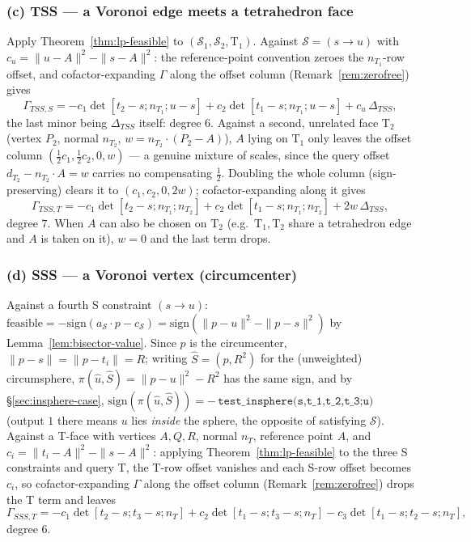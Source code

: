 \documentclass[12pt]{article}
\makeatletter
\theoremstyle{definition}
\theoremstyle{remark}
\renewenvironment{proof}[1][\proofname]{\par
  \pushQED{\qed}%
  \normalfont \footnotesize \topsep6\p@\@plus6\p@\relax
  \list{}{\leftmargin=2em
          \settowidth{\itemindent}{\itshape#1}%
          \labelwidth=\itemindent
          \parsep=0pt \listparindent=\parindent 
  }
  \item[\hskip\labelsep
        \itshape
    #1\@addpunct{.}]\ignorespaces
}{%
  \popQED\endlist\@endpefalse
}
\makeatother
\begin{document}
\begin{proof}
\subsubsection*{(c) TSS --- a Voronoi edge meets a tetrahedron face}
Apply Theorem~\ref{thm:lp-feasible} to $(\mathcal S_1,\mathcal S_2,\mathrm
T_1)$. Against $\mathcal S=(s\!\to\!u)$ with $c_u=\|u-A\|^2-\|s-A\|^2$: the
reference-point convention zeroes the $n_{T_1}$-row offset, and
cofactor-expanding $\Gamma$ along the offset column (Remark~\ref{rem:zerofree})
gives
\begin{equation*}
    \Gamma_{TSS,S} = -c_1\det[t_2{-}s;n_{T_1};u{-}s] + c_2\det[t_1{-}s;n_{T_1};u{-}s] + c_u\,\Delta_{TSS},
\end{equation*}
the last minor being $\Delta_{TSS}$ itself: degree $6$. Against a second,
unrelated face $\mathrm T_2$ (vertex $P_2$, normal $n_{T_2}$,
$w=n_{T_2}\cdot(P_2-A)$), $A$ lying on $\mathrm T_1$ only leaves the offset
column $(\tfrac12c_1,\tfrac12c_2,0,w)$ --- a genuine mixture of scales,
since the query offset $d_{T_2}-n_{T_2}\cdot A=w$ carries no compensating
$\tfrac12$. Doubling the whole column (sign-preserving) clears it to
$(c_1,c_2,0,2w)$; cofactor-expanding along it gives
\begin{equation*}
    \Gamma_{TSS,T} = -c_1\det[t_2{-}s;n_{T_1};n_{T_2}] + c_2\det[t_1{-}s;n_{T_1};n_{T_2}] + 2w\,\Delta_{TSS},
\end{equation*}
degree $7$. When $A$ can also be chosen on $\mathrm T_2$ (e.g.\ $\mathrm
T_1,\mathrm T_2$ share a tetrahedron edge and $A$ is taken on it), $w=0$
and the last term drops.

\subsubsection*{(d) SSS --- a Voronoi vertex (circumcenter)}
Against a fourth S constraint $(s\!\to\!u)$: $\mathrm{feasible} =
-\mathrm{sign}(a_{\mathcal S}\cdot p-c_{\mathcal S}) =
\mathrm{sign}(\|p-u\|^2-\|p-s\|^2)$ by Lemma~\ref{lem:bisector-value}. Since
$p$ is the circumcenter, $\|p-s\|=\|p-t_i\|=R$; writing $\hat S=(p,R^2)$ for
the (unweighted) circumsphere, $\pi(\hat u,\hat S)=\|p-u\|^2-R^2$ has the
same sign, and by \S\ref{sec:insphere-case},
$\mathrm{sign}(\pi(\hat u,\hat S)) = -\,\texttt{test\_insphere(s,t\_1,t\_2,t\_3;u)}$
(output $1$ there means $u$ lies \emph{inside} the sphere, the opposite of
satisfying $\mathcal S$). Against a T-face with vertices $A,Q,R$, normal
$n_T$, reference point $A$, and $c_i=\|t_i-A\|^2-\|s-A\|^2$: applying
Theorem~\ref{thm:lp-feasible} to the three S constraints and query T, the
T-row offset vanishes and each S-row offset becomes $c_i$, so
cofactor-expanding $\Gamma$ along the offset column (Remark~\ref{rem:zerofree})
drops the T term and leaves
\begin{equation*}
    \Gamma_{SSS,T} = -c_1\det[t_2{-}s;t_3{-}s;n_T] + c_2\det[t_1{-}s;t_3{-}s;n_T] - c_3\det[t_1{-}s;t_2{-}s;n_T],
\end{equation*}
degree $6$.
\end{proof}
\end{document}
